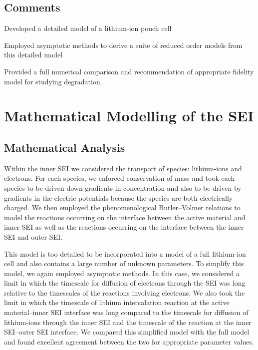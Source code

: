 \documentclass[english,a4paper,oneside,9pt]{extarticle}
\begin{document}
\subsection{Comments}
\begin{infommitemize}
	\item Developed a detailed model of a lithium-ion pouch cell
	\item Employed asymptotic methods to derive a suite of reduced order models from this detailed model
	\item Provided a full numerical comparison and recommendation of appropriate fidelity model for studying degradation.
\end{infommitemize}

\section{Mathematical Modelling of the SEI}
\subsection{Mathematical Analysis}
Within the inner SEI we considered the transport of species: lithium-ions and electrons. For each species, we enforced conservation of mass and took each species to be driven down gradients in concentration and also to be driven by gradients in the electric potentials because the species are both electrically charged. We then employed the phenomenological Butler--Volmer relations to model the reactions occurring on the interface between the active material and inner SEI as well as the reactions occurring on the interface between the inner SEI and outer SEI.

This model is too detailed to be incorporated into a model of a full lithium-ion cell and also contains a large number of unknown parameters. To simplify this model, we again employed asymptotic methods. In this case, we considered a limit in which the timescale for diffusion of electrons through the SEI was long relative to the timescales of the reactions involving electrons. We also took the limit in which the timescale of lithium intercalation reaction at the active material--inner SEI interface was long compared to the timescale for diffusion of lithium-ions through the inner SEI and the timescale of the reaction at the inner SEI--outer SEI interface. We compared this simplified model with the full model and found excellent agreement between the two for appropriate parameter values.
\end{document}
